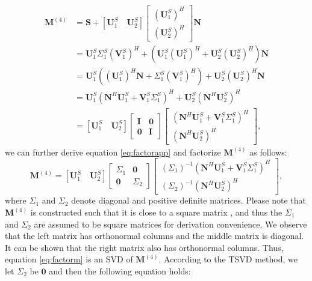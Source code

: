 \begin{equation}
\label{eq:factorapp}
\begin{split}
\mathbf{M}^{(4)}&=\mathbf{S}+[\mathbf{U}_1^S\quad \mathbf{U}_2^S]\left[\begin{array}{c} 
(\mathbf{U}_1^S)^H \\
(\mathbf{U}_2^S)^H
\end{array}
\right]\mathbf{N} \\
&=\mathbf{U}_1^S\Sigma_1^S(\mathbf{V}_1^S)^H + \left( 
\mathbf{U}_1^S(\mathbf{U}_1^S)^H+\mathbf{U}_2^S(\mathbf{U}_2^S)^H
\right)\mathbf{N}\\
&=\mathbf{U}_1^S \left(
(\mathbf{U}_1^S)^H\mathbf{N}+\Sigma_1^S(\mathbf{V}_1^S)^H
\right)+\mathbf{U}_2^S(\mathbf{U}_2^S)^H\mathbf{N}\\
&=\mathbf{U}_1^S\left(
\mathbf{N}^H\mathbf{U}_1^S+\mathbf{V}_1^S\Sigma_1^S
\right)^H + \mathbf{U}_2^S(\mathbf{N}^H\mathbf{U}_2^S)^H\\
&= [\mathbf{U}_1^S \quad \mathbf{U}_2^S]\left[\begin{array}{cc} 
\mathbf{I} & \mathbf{0}\\
\mathbf{0} & \mathbf{I}
\end{array}
\right]\left[\begin{array}{c} 
(\mathbf{N}^H\mathbf{U}_1^S+\mathbf{V}_1^S\Sigma_1^S)^H\\
(\mathbf{N}^H\mathbf{U}_2^S)^H
\end{array}
\right],
\end{split}
\end{equation}
we can further derive equation \ref{eq:factorapp} and factorize $\mathbf{M}^{(4)}$ as follows:
\begin{equation}
\label{eq:factorm}
\mathbf{M}^{(4)} = [\mathbf{U}_1^S \quad \mathbf{U}_2^S]\left[\begin{array}{cc} 
\Sigma_{1} & \mathbf{0}\\
\mathbf{0} & \Sigma_{2}
\end{array}
\right]\left[\begin{array}{c} 
(\Sigma_{1})^{-1}(\mathbf{N}^H\mathbf{U}_1^S+\mathbf{V}_1^S\Sigma_1^S)^H\\
(\Sigma_{2})^{-1}(\mathbf{N}^H\mathbf{U}_2^S)^H
\end{array}
\right],
\end{equation} 
where $\Sigma_1$ and $\Sigma_2$ denote diagonal and positive definite matrices. Please note that $\mathbf{M}^{(4)}$ is constructed such that it is close to a square matrix \cite[]{mssa}, and thus the $\Sigma_1$ and $\Sigma_2$ are assumed to be square matrices for derivation convenience.  We observe that the left matrix has orthonormal columns and the middle matrix is diagonal. It can be shown that the right matrix also has orthonormal columns.  Thus, equation \ref{eq:factorm} is an SVD of $\mathbf{M}^{(4)}$. According to the TSVD method, we let $\Sigma_2$ be $\mathbf{0}$ and then the following equation holds:
